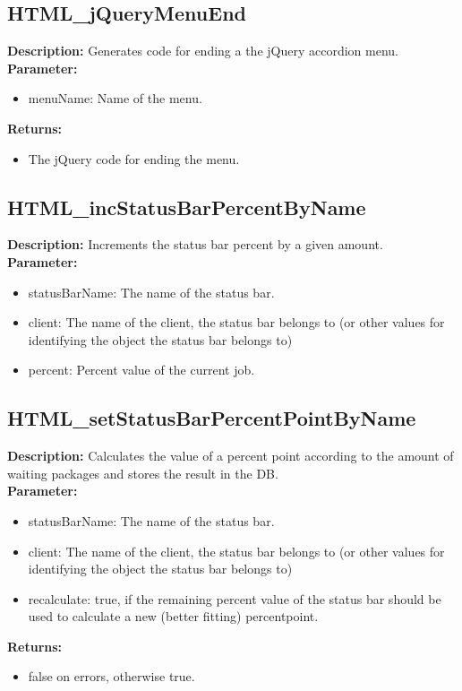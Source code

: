 \subsection{HTML\_jQueryMenuEnd}
\textbf{Description:} Generates code for ending a the jQuery accordion menu.\\
\textbf{Parameter:}
\begin{itemize}
\item menuName: Name of the menu.
\end{itemize}
\textbf{Returns:}
\begin{itemize}
\item The jQuery code for ending the menu.
\end{itemize}

\subsection{HTML\_incStatusBarPercentByName}
\textbf{Description:} Increments the status bar percent by a given amount.\\
\textbf{Parameter:}
\begin{itemize}
\item statusBarName: The name of the status bar.
\item client: The name of the client, the status bar belongs to (or other values for identifying the object the status bar belongs to)
\item percent: Percent value of the current job.
\end{itemize}

\subsection{HTML\_setStatusBarPercentPointByName}
\textbf{Description:} Calculates the value of a percent point according to the amount of waiting packages and stores the result in the DB.\\
\textbf{Parameter:}
\begin{itemize}
\item statusBarName: The name of the status bar.
\item client: The name of the client, the status bar belongs to (or other values for identifying the object the status bar belongs to)
\item recalculate: true, if the remaining percent value of the status bar should be used to calculate a new (better fitting) percentpoint.
\end{itemize}
\textbf{Returns:}
\begin{itemize}
\item false on errors, otherwise true.
\end{itemize}

